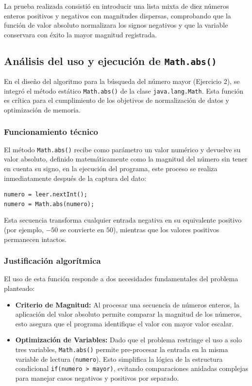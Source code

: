 
\clearpage

La prueba realizada consistió en introducir una lista mixta de diez números enteros positivos y negativos con magnitudes dispersas, comprobando que la función de valor absoluto normalizara los signos negativos y que la variable conservara con éxito la mayor magnitud registrada.

\subsection{Análisis del uso y ejecución de \texttt{Math.abs()}}

En el diseño del algoritmo para la búsqueda del número mayor (Ejercicio 2), se integró el método estático \texttt{Math.abs()} de la clase \texttt{java.lang.Math}. Esta función es crítica para el cumplimiento de los objetivos de normalización de datos y optimización de memoria.

\subsubsection{Funcionamiento técnico}
El método \texttt{Math.abs()} recibe como parámetro un valor numérico y devuelve su valor absoluto, definido matemáticamente como la magnitud del número sin tener en cuenta su signo, en la ejecución del programa, este proceso se realiza inmediatamente después de la captura del dato:

\begin{verbatim}
numero = leer.nextInt();
numero = Math.abs(numero);
\end{verbatim}

Esta secuencia transforma cualquier entrada negativa en su equivalente positivo (por ejemplo, $-50$ se convierte en $50$), mientras que los valores positivos permanecen intactos. 

\subsubsection{Justificación algorítmica}
El uso de esta función responde a dos necesidades fundamentales del problema planteado:

\begin{itemize}
    \item \textbf{Criterio de Magnitud:} Al procesar una secuencia de números enteros, la aplicación del valor absoluto permite comparar la magnitud de los números, esto asegura que el programa identifique el valor con mayor valor escalar.
    \item \textbf{Optimización de Variables:} Dado que el problema restringe el uso a solo tres variables, \texttt{Math.abs()} permite pre-procesar la entrada en la misma variable de lectura (\texttt{numero}). Esto simplifica la lógica de la estructura condicional \texttt{if(numero > mayor)}, evitando comparaciones anidadas complejas para manejar casos negativos y positivos por separado.
\end{itemize}

